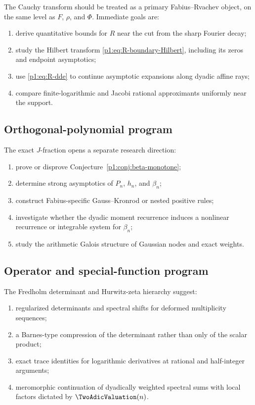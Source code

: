 \documentclass[11pt]{article}
\theoremstyle{definition}
\theoremstyle{remark}
\begin{document}
The Cauchy transform should be treated as a primary Fabius--Rvachev object, on the same
level as \(F\), \(\rho\), and \(\Phi\).  Immediate goals are:

\begin{enumerate}
\item derive quantitative bounds for \(R\) near the cut from the sharp Fourier decay;
\item study the Hilbert transform \eqref{p1:eq:R-boundary-Hilbert}, including its zeros and
      endpoint asymptotics;
\item use \eqref{p1:eq:R-dde} to continue asymptotic expansions along dyadic affine rays;
\item compare finite-logarithmic and Jacobi rational approximants uniformly near the
      support.
\end{enumerate}

\subsection{Orthogonal-polynomial program}

The exact \(J\)-fraction opens a separate research direction:

\begin{enumerate}
\item prove or disprove Conjecture~\ref{p1:conj:beta-monotone};
\item determine strong asymptotics of \(P_n\), \(h_n\), and \(\beta_n\);
\item construct Fabius-specific Gauss--Kronrod or nested positive rules;
\item investigate whether the dyadic moment recurrence induces a nonlinear recurrence or
      integrable system for \(\beta_n\);
\item study the arithmetic Galois structure of Gaussian nodes and exact weights.
\end{enumerate}

\subsection{Operator and special-function program}

The Fredholm determinant and Hurwitz-zeta hierarchy suggest:

\begin{enumerate}
\item regularized determinants and spectral shifts for deformed multiplicity sequences;
\item a Barnes-type compression of the determinant rather than only of the scalar product;
\item exact trace identities for logarithmic derivatives at rational and half-integer
      arguments;
\item meromorphic continuation of dyadically weighted spectral sums with local factors
      dictated by \(\TwoAdicValuation(n)\).
\end{enumerate}
\end{document}
